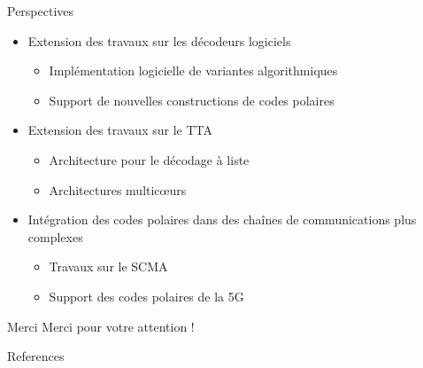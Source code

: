 \begin{frame}[c]{Perspectives}

  \begin{itemize}
    \renewcommand*{\bibfont}{\scriptsize}
    \vfill
    \item<+-> Extension des travaux sur les décodeurs logiciels
    \begin{itemize}
      \item Implémentation logicielle de variantes algorithmiques
      \item Support de nouvelles constructions de codes polaires
    \end{itemize}
    \vfill
    \item<+-> Extension des travaux sur le TTA
    \begin{itemize}
      \item Architecture pour le décodage à liste
      \item Architectures multicœurs
    \end{itemize}
    \vfill
    \item<+-> Intégration des codes polaires dans des chaînes de communications plus complexes
    \begin{itemize}
      \item Travaux sur le SCMA
      \item Support des codes polaires de la 5G
    \end{itemize}
    \vfill
  \end{itemize}

\end{frame}

\begin{frame}[c]{Merci}
\vfill
\centering
Merci pour votre attention !
\vfill
\end{frame}

\begin{frame}[allowframebreaks]{References}
\renewcommand*{\bibfont}{\scriptsize}

\printbibliography
\end{frame}
